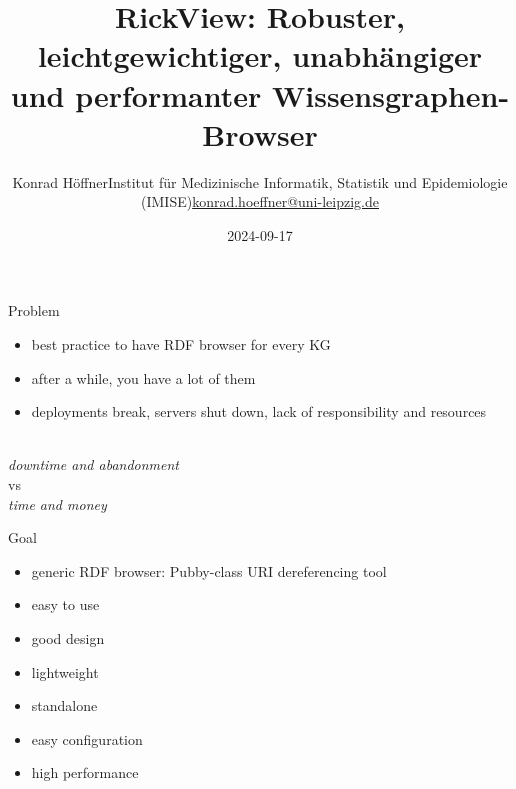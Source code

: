 \documentclass[14pt,aspectratio=169]{beamer}
\date{2024-09-17}
\author{\texorpdfstring{Konrad Höffner\newline{}Institut für Medizinische Informatik, Statistik und Epidemiologie (IMISE)\newline{}\url{konrad.hoeffner@uni-leipzig.de}}{Konrad Höffner}}
\title{RickView: Robuster, leichtgewichtiger, unabhängiger und performanter Wissensgraphen-Browser}
\subtitle{}
\begin{document}
\begin{frame}
\titlepage
\end{frame}

\begin{frame}{Problem}
\begin{itemize}
\item best practice to have RDF browser for every KG 
\item after a while, you have a lot of them
\item deployments break, servers shut down, lack of responsibility and resources
\end{itemize}
~\\
\centering
\emph{downtime and abandonment}\\
vs\\
\emph{time and money}
\end{frame}

\begin{frame}{Goal}
\begin{itemize}
\item generic RDF browser: Pubby-class URI dereferencing tool
\item easy to use
\item good design
\item lightweight
\item standalone%
\item easy configuration 
\item high performance
\end{itemize}
\end{frame}
\end{document}
